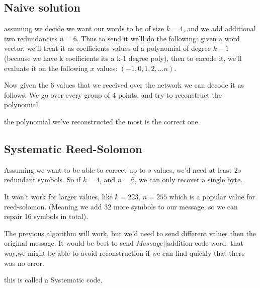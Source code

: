 \subsection{Naive solution}
assuming we decide we want our words to be of size $k=4$, and we add additional two redundancies $n=6$. 
Thus to send it we'll do the following: given a word vector, we'll treat it as coefficients values of a 
polynomial of degree $k-1$ (because we have k coefficients its a k-1 degree poly), then to encode it, we'll evaluate it on the following $x$ values: $(-1,0,1,2,\dots n)$.


Now given the 6 values that we received over the network we can decode it as follows: 
We go over every group of 4 points, and try to reconstruct the polynomial. 

the polynomial we've reconstructed the most is the correct one.

\subsection{Systematic Reed-Solomon}
Assuming we want to be able to correct up to $s$ values, we'd need at least $2s$ redundant symbols.
So if $k=4$, and $n=6$, we can only recover a single byte.

It won't work for larger values, like $k=223$, $n=255$ which is a popular value for reed-solomon.
(Meaning we add 32 more symbols to our message, so we can repair 16 symbols in total).

The previous algorithm will work, but we'd need to send different values then 
the original message. It would be best to send $Message||\text{addition code word}$.
that way,we might be able to avoid reconstruction if we can find quickly that there was no error.

this is called a Systematic code. 
